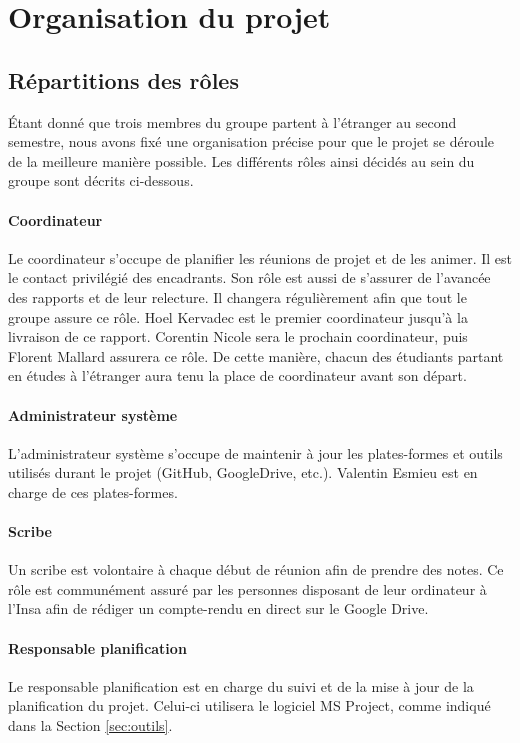 \section{Organisation du projet}
	\subsection{Répartitions des rôles}
	    Étant donné que trois membres du groupe partent à l'étranger au second semestre, nous avons fixé une organisation précise pour que le projet se déroule de la meilleure manière possible. Les différents rôles ainsi décidés au sein du groupe sont décrits ci-dessous.
	    
	    \paragraph{Coordinateur} Le coordinateur s'occupe de planifier les réunions de projet et de les animer. Il est le contact privilégié des encadrants. Son rôle est aussi de s'assurer de l'avancée des rapports et de leur relecture. Il changera régulièrement afin que tout le groupe assure ce rôle. Hoel {\sc Kervadec} est le premier coordinateur jusqu'à la livraison de ce rapport. Corentin {\sc Nicole} sera le prochain coordinateur, puis Florent {\sc Mallard} assurera ce rôle. De cette manière, chacun des étudiants partant en études à l'étranger aura tenu la place de coordinateur avant son départ.
	    
	    \paragraph{Administrateur système} L'administrateur système s'occupe de maintenir à jour les plates-formes et outils utilisés durant le projet (GitHub, GoogleDrive, etc.). Valentin {\sc Esmieu} est en charge de ces plates-formes.
	    
	    \paragraph{Scribe} Un scribe est volontaire à chaque début de réunion afin de prendre des notes. Ce rôle est communément assuré par les personnes disposant de leur ordinateur à l'{\sc Insa} afin de rédiger un compte-rendu en direct sur le Google Drive.
	    
	    \paragraph{Responsable planification} Le responsable planification est en charge du suivi et de la mise à jour de la planification du projet. Celui-ci utilisera le logiciel MS Project, comme indiqué dans la Section \ref{sec:outils}.
	    

